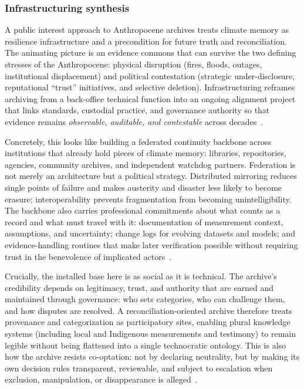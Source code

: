 \documentclass[acmsmall,screen]{acmart}
\begin{document}
\subsubsection*{Infrastructuring synthesis}
A public interest approach to Anthropocene archives treats climate memory as resilience infrastructure and a precondition for future truth and reconciliation. The animating picture is an evidence commons that can survive the two defining stresses of the Anthropocene: physical disruption (fires, floods, outages, institutional displacement) and political contestation (strategic under-disclosure, reputational ``trust'' initiatives, and selective deletion). Infrastructuring reframes archiving from a back-office technical function into an ongoing alignment project that links standards, custodial practice, and governance authority so that evidence remains \emph{observable, auditable, and contestable} across decades~\cite{aanestadInformationInfrastructuresChallenge2017,karastiStudyingInfrastructuringEthnographically2018a}.

Concretely, this looks like building a federated continuity backbone across institutions that already hold pieces of climate memory: libraries, repositories, agencies, community archives, and independent watchdog partners. Federation is not merely an architecture but a political strategy. Distributed mirroring reduces single points of failure and makes austerity and disaster less likely to become erasure; interoperability prevents fragmentation from becoming unintelligibility. The backbone also carries professional commitments about what counts as a record and what must travel with it: documentation of measurement context, assumptions, and uncertainty; change logs for evolving datasets and models; and evidence-handling routines that make later verification possible without requiring trust in the benevolence of implicated actors~\cite{yeoConceptsRecord12007,josiasUnderstandingArchivesFeature2011}.

Crucially, the installed base here is as social as it is technical. The archive's credibility depends on legitimacy, trust, and authority that are earned and maintained through governance: who sets categories, who can challenge them, and how disputes are resolved. A reconciliation-oriented archive therefore treats provenance and categorization as participatory sites, enabling plural knowledge systems (including local and Indigenous measurements and testimony) to remain legible without being flattened into a single technocratic ontology. This is also how the archive resists co-optation: not by declaring neutrality, but by making its own decision rules transparent, reviewable, and subject to escalation when exclusion, manipulation, or disappearance is alleged~\cite{blankeReassemblingDigitalArchives2024,ghaddarSpectreArchiveTruth2016}.
\end{document}
